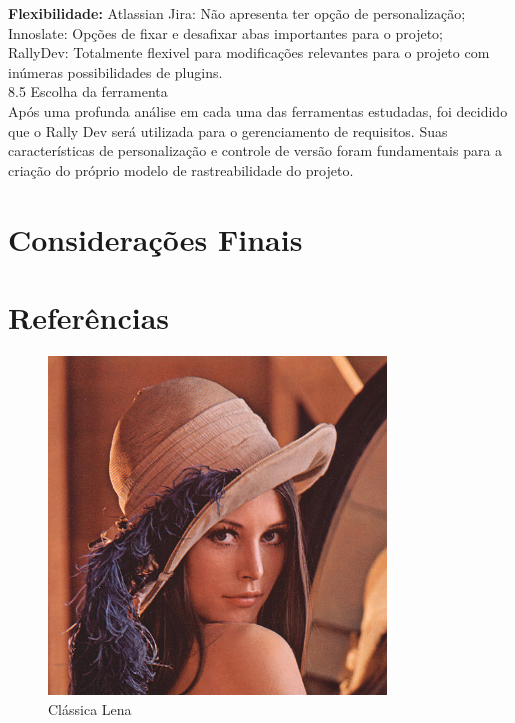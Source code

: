 {{\textbf{Flexibilidade:}
	\tab Atlassian Jira: Não apresenta ter opção de personalização;\\
	\tab Innoslate: Opções de fixar e desafixar abas importantes para o projeto;\\
	\tab RallyDev: Totalmente flexivel para modificações relevantes para o projeto com inúmeras possibilidades de plugins.\\

{\large{8.5 Escolha da ferramenta}}\\

\tab Após uma profunda análise em cada uma das ferramentas estudadas, foi decidido que o Rally Dev será utilizada para o gerenciamento de requisitos. Suas características de personalização e controle de versão foram fundamentais para a criação do próprio modelo de rastreabilidade do projeto.  \\


\section{Considerações Finais}
\label{sec:nova_sess_o}

\section{Referências}
\label{sec:nova_sess_o}




\onecolumn
\begin{usecase}



\end{usecase}
\onecolumn

\onecolumn
\begin{figure}[h]
  \begin{center}
    \includegraphics[width=0.8\textwidth]{conteudo/lena}
    \caption{Clássica Lena}
  \end{center}
\end{figure}
\onecolumn

}}
